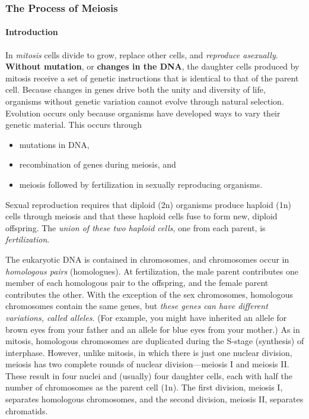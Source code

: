 \subsubsection{The Process of Meiosis}
\paragraph{Introduction}
In \emph{mitosis} cells divide to grow, replace other cells, and \emph{reproduce asexually}. \textbf{Without mutation}, or \textbf{changes in the DNA}, the daughter cells produced by mitosis receive a set of genetic instructions that is identical to that of the parent cell. Because changes in genes drive both the unity and diversity of life, organisms without genetic variation cannot evolve through natural selection. Evolution occurs only because organisms have developed ways to vary their genetic material. This occurs through 
\begin{itemize}
    \item mutations in DNA, 
    \item recombination of genes during meiosis, and 
    \item meiosis followed by fertilization in sexually reproducing organisms.
\end{itemize}
Sexual reproduction requires that diploid (2n) organisms produce haploid (1n) cells through meiosis and that these haploid cells fuse to form new, diploid offspring. The \emph{union of these two haploid cells}, one from each parent, is \emph{fertilization}.

The eukaryotic DNA is contained in chromosomes, and chromosomes occur in \emph{homologous pairs} (homologues). At fertilization, the male parent contributes one member of each homologous pair to the offspring, and the female parent contributes the other. With the exception of the sex chromosomes, homologous chromosomes contain the same genes, but \emph{these genes can have different variations, called alleles}. (For example, you might have inherited an allele for brown eyes from your father and an allele for blue eyes from your mother.) As in mitosis, homologous chromosomes are duplicated during the S-stage (synthesis) of interphase. However, unlike mitosis, in which there is just one nuclear division, meiosis has two complete rounds of nuclear division—meiosis I and meiosis II. These result in four nuclei and (usually) four daughter cells, each with half the number of chromosomes as the parent cell (1n). The first division, meiosis I, separates homologous chromosomes, and the second division, meiosis II, separates chromatids. 



